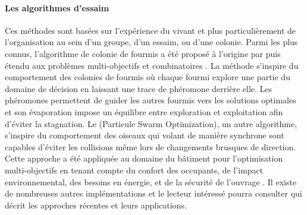 \paragraph{Les algorithmes d’essaim} %
\label{par:les_algorithmes_d_essaim}
Ces méthodes sont basées sur l’expérience du vivant et plus particulièrement de
l’organisation au sein d’un groupe, d’un essaim, ou d’une colonie. Parmi les plus connus,
l’algorithme de colonie de fourmis a été proposé à l’origine par \textcite{Colorni1992509}
puis étendu aux problèmes multi-objectifs et combinatoires
\parencite{MichaelGuntsch2003,Shea2006627}.
La méthode s’inspire du comportement des colonies de fourmis où chaque fourmi
explore une partie du domaine de décision en laissant une trace de phéromone
derrière elle. Les phéromones permettent de guider les autres fourmis vers les
solutions optimales et son évaporation impose un équilibre entre exploration et
exploitation afin d’éviter la stagnation.
Le  (Particule Swarm Optimization), un autre algorithme, s’inspire du
comportement des oiseaux qui volant de manière synchrone sont capables
d’éviter les collisions même lors de changements brusques de direction. Cette
approche a été appliquée au domaine du bâtiment pour l’optimisation multi-objectifs
en tenant compte du confort des occupants, de l’impact environnemental,
des besoins en énergie, et de la sécurité de l’ouvrage \parencite{Armand-Decker2015}.
Il existe de nombreuses autres implémentations et le lecteur intéressé pourra
consulter \textcite{Aboul-EllaHassanien2015} qui décrit les approches récentes et
leurs applications.


